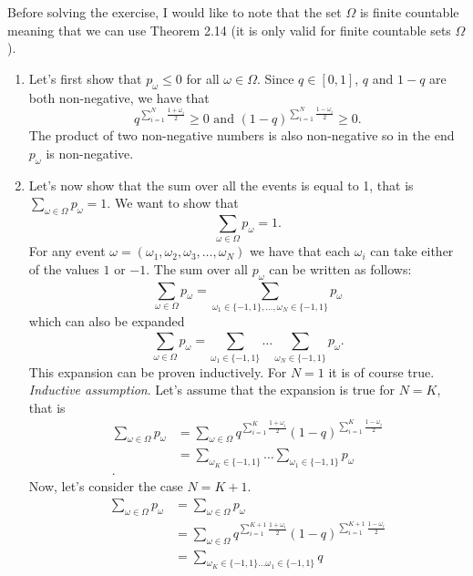 Before solving the exercise, I would like to note that the set $ \Omega$ is 
finite countable meaning that we can use Theorem 2.14 (it is only valid for
finite countable sets $ \Omega $). 

\begin{enumerate}
\item Let's first show that $ p_{\omega} \leq 0$ for all $\omega \in \Omega$. 
Since $ q \in [0,1]$, $ q$ and $ 1-q$ are both non-negative, we have that 
\[
q^{\sum_{i=1}^{N} \frac{1+\omega_{i}}{2}} \geq 0 \mbox{ and } (1-q)^{ \sum_{i=1}^{N}
\frac{1-\omega_{i}}{2}} \geq 0 
.\] 
The product of two non-negative numbers is also non-negative so in the end $ p_{\omega} $ is
non-negative.

\item Let's now show that the sum over all the events is equal to 1, that is 
$\sum_{\omega \in \Omega}  p_{\omega} =1 $. We want to show that
\[
\sum_{\omega \in \Omega} p_{\omega} = 1
.\] 
For any event $ \omega  = (\omega_{1}, \omega_{2} , \omega_{3} ,\dots, \omega_{N}  ) $
we have that each $ \omega_{i} $ can take either of the values $ 1$ or $ -1$. 
The sum over all $ p_{\omega} $ can be written as follows:
\[
\sum_{\omega \in \Omega}^{} p_{\omega}  = \sum_{\omega_{1} \in \{ -1,1 \}, \dots, \omega_{N} \in \{ -1,1 \}
}^{} p_{\omega} 
\] 
which can also be expanded 
\[
\sum_{\omega \in \Omega}^{} p_{\omega}  = \sum_{\omega_{1} \in \{ -1,1 \} }^{} \dots \sum_{\omega_{N}  \in \{
-1,1 \} }^{} p_{\omega} 
.\] 
This expansion can be proven inductively. For $ N=1$ it is of course true. \textit{Inductive
assumption}. Let's assume that the expansion is true for $ N =K$, that is 
\begin{align*}
    \sum_{\omega \in \Omega}^{} p_{\omega}  &= \sum_{\omega \in \Omega}^{} q^{
    \sum_{i=1}^{K}\frac{1+ \omega_{i} }{2} } (1-q)^{ \sum_{i=1}^{K} \frac{1-\omega_{i}}{2} } \\
					    &=\sum_{\omega_{K} \in \{ -1,1 \} }^{} \dots \sum_{\omega_{1}  \in \{
-1,1 \} }^{} p_{\omega} \\
.
\end{align*}
Now, let's consider the case $ N= K+1$. 
\begin{align*}
\sum_{\omega \in \Omega}^{} p_{\omega} &= \sum_{\omega \in \Omega}^{} p_{\omega} \\
&= \sum_{\omega \in \Omega}^{}  q^{ \sum_{i=1}^{K+1}\frac{1+ \omega_{i} }{2} } (1-q)^{ \sum_{i=1}^{K+1} \frac{1-\omega_{i}}{2} }\\
&= \sum_{\omega_{K} \in \{ -1,1 \} \dots \omega_{1} \in \{ -1,1 \}  }^{} q^{
}
\end{align*}
\end{enumerate}
